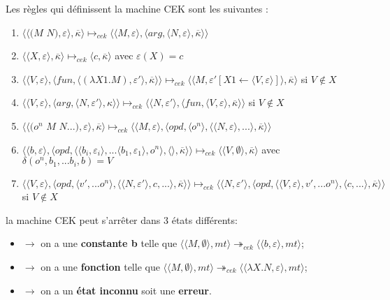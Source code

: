 \documentclass[10pt,a4paper]{article}
\begin{document}
				
				Les règles qui définissent la machine CEK sont les suivantes :
				\begin{enumerate}
					\item $\langle\langle(M$ $N),\varepsilon\rangle,\overline{\kappa}\rangle \longmapsto_{cek} \langle \langle M,\varepsilon\rangle,\langle arg,\langle N,\varepsilon\rangle,\overline{\kappa}\rangle\rangle$	
					\item $\langle\langle X,\varepsilon\rangle,\overline{\kappa}\rangle \longmapsto_{cek} \langle c,\overline{\kappa}\rangle$ avec $\varepsilon(X) = c$
					\item $\langle\langle V,\varepsilon\rangle,\langle fun,\langle (\lambda X1.M),\varepsilon'\rangle,\overline{\kappa} \rangle \rangle \longmapsto_{cek} \langle \langle M,\varepsilon'[X1 \leftarrow \langle V,\varepsilon\rangle]\rangle,\overline{\kappa}\rangle$ si $V \notin X$
					\item  $\langle \langle V,\varepsilon\rangle,\langle arg,\langle N,\varepsilon'\rangle,\kappa\rangle\rangle \longmapsto_{cek} \langle \langle N,\varepsilon'\rangle,\langle fun,\langle V,\varepsilon\rangle,\overline{\kappa}\rangle\rangle$ si $V \notin X$
					\item $\langle\langle(o^{n}$ $M$ $N...),\varepsilon\rangle,\overline{\kappa}\rangle \longmapsto_{cek} \langle \langle M,\varepsilon\rangle,\langle opd,\langle o^{n}\rangle,\langle \langle N,\varepsilon\rangle,...\rangle,\overline{\kappa}\rangle\rangle$
					\item $\langle  \langle b,\varepsilon\rangle,\langle opd,\langle \langle b_{i},\varepsilon_{i}\rangle,...\langle b_{1},\varepsilon_{1}\rangle ,o^{n}\rangle,\langle\rangle,\overline{\kappa}\rangle\rangle \longmapsto_{cek} \langle \langle V,\emptyset\rangle,\overline{\kappa}\rangle$ avec $\delta(o^{n},b_{1},...b_{i},b) = V$
					\item $\langle \langle V,\varepsilon\rangle,\langle opd,\langle v',...o^{n}\rangle,\langle  \langle N,\varepsilon'\rangle,c,...\rangle,\overline{\kappa}\rangle\rangle \longmapsto_{cek} \langle \langle N,\varepsilon'\rangle,\langle opd,\langle  \langle V,\varepsilon\rangle,v',...o^{n}\rangle,\langle c,...\rangle,\overline{\kappa}\rangle\rangle$ si $V \notin X$
				\end{enumerate}
				\bigbreak
				
				
				la machine CEK peut s'arrêter dans 3 états différents:
				\begin{itemize}
					\item[]$\longrightarrow$ on a une \textbf{constante b} telle que $\langle \langle M,\emptyset\rangle,mt\rangle \twoheadrightarrow_{cek} \langle\langle b,\varepsilon\rangle,mt\rangle$;
					\item[]$\longrightarrow$ on a une \textbf{fonction} telle que $\langle \langle M,\emptyset\rangle,mt\rangle \twoheadrightarrow_{cek} \langle\langle \lambda X.N,\varepsilon\rangle,mt\rangle$;
					\item[]$\longrightarrow$ on a un \textbf{état inconnu} soit une \textbf{erreur}.
				\end{itemize}
				\bigbreak
				
\end{document}
